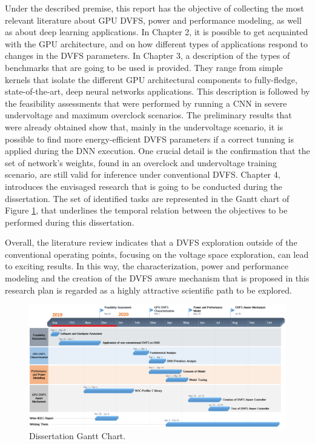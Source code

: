 Under the described premise, this report has the objective of collecting the most relevant literature about GPU DVFS, power and performance modeling, as well as about deep learning applications. In Chapter 2, it is possible to get acquainted with the GPU architecture, and on how different types of applications respond to changes in the DVFS parameters. In Chapter 3, a description of the types of benchmarks that are going to be used is provided. They range from simple kernels that isolate the different GPU architectural components to fully-fledge, state-of-the-art, deep neural networks applications.  This description is followed by the feasibility assessments that were performed by running a CNN in severe undervoltage and maximum overclock scenarios. The preliminary results that were already obtained show that, mainly in the undervoltage scenario, it is possible to find more energy-efficient DVFS parameters if a correct tunning is applied during the DNN execution. One crucial detail is the confirmation that the set of network's weights, found in an overclock and undervoltage training scenario, are still valid for inference under conventional DVFS. Chapter 4, introduces the envisaged research that is going to be conducted during the dissertation. The set of identified tasks are represented in the Gantt chart of Figure \ref{fig:gantt}, that underlines the temporal relation between the objectives to be performed during this dissertation.

Overall, the literature review indicates that a DVFS exploration outside of the conventional operating points, focusing on the voltage space exploration, can lead to exciting results. In this way, the characterization, power and performance modeling and the creation of the DVFS aware mechanism that is proposed in this research plan is regarded as a highly attractive scientific path to be explored.

\begin{figure}[t!]
  \centering
  \includegraphics[width=1\textwidth]{Figures/Conclusion/Gantt.png}
  \caption[Conclusion]{Dissertation Gantt Chart.}
  \label{fig:gantt}
\end{figure}

